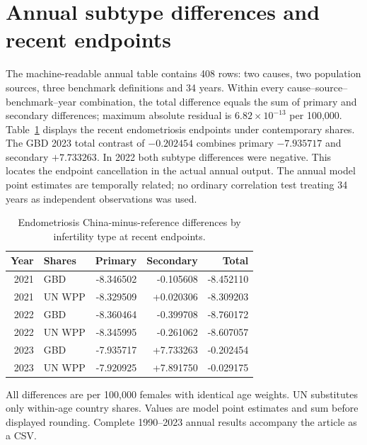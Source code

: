 \documentclass[11pt,a4paper]{article}
\begin{document}
\section*{Annual subtype differences and recent endpoints}
The machine-readable annual table contains 408 rows: two causes, two population sources, three benchmark definitions and 34 years. Within every cause--source--benchmark--year combination, the total difference equals the sum of primary and secondary differences; maximum absolute residual is $6.82\times10^{-13}$ per 100,000. Table~\ref{tab:s10} displays the recent endometriosis endpoints under contemporary shares. The GBD 2023 total contrast of $-0.202454$ combines primary $-7.935717$ and secondary $+7.733263$. In 2022 both subtype differences were negative. This locates the endpoint cancellation in the actual annual output. The annual model point estimates are temporally related; no ordinary correlation test treating 34 years as independent observations was used.

\small
\begin{longtable}{rlrrr}
\caption{Endometriosis China-minus-reference differences by infertility type at recent endpoints.}\label{tab:s10}\\
\toprule Year & Shares & Primary & Secondary & Total\\\midrule\endhead
2021 & GBD & -8.346502 & -0.105608 & -8.452110\\
2021 & UN WPP & -8.329509 & +0.020306 & -8.309203\\
2022 & GBD & -8.360464 & -0.399708 & -8.760172\\
2022 & UN WPP & -8.345995 & -0.261062 & -8.607057\\
2023 & GBD & -7.935717 & +7.733263 & -0.202454\\
2023 & UN WPP & -7.920925 & +7.891750 & -0.029175\\
\bottomrule

\end{longtable}\normalsize
All differences are per 100,000 females with identical age weights. UN substitutes only within-age country shares. Values are model point estimates and sum before displayed rounding. Complete 1990--2023 annual results accompany the article as a CSV.
\end{document}

